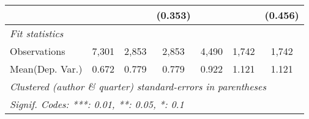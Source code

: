 \begin{tabular}{lcccccc}
                           &              &         & (0.353)     &              &         & (0.456)\\   
   \midrule
   \emph{Fit statistics}\\
   Observations            & 7,301        & 2,853   & 2,853       & 4,490        & 1,742   & 1,742\\  
Mean(Dep. Var.) & 0.672 & 0.779 & 0.779 & 0.922 & 1.121 & 1.121 \\
   \midrule \midrule
   \multicolumn{7}{l}{\emph{Clustered (author \& quarter) standard-errors in parentheses}}\\
   \multicolumn{7}{l}{\emph{Signif. Codes: ***: 0.01, **: 0.05, *: 0.1}}\\
\end{tabular}
\par\endgroup
